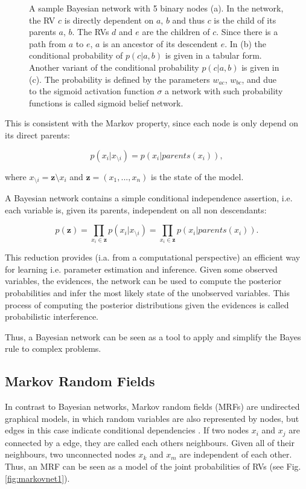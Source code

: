 \begin{figure}
\begin{subfigure}[t]{.33\textwidth}
  		\caption{}
  		\label{fig:sub3}
	\end{subfigure}
	\caption[A sample Bayesian network with 5 binary nodes.]{A sample Bayesian network with 5 binary nodes (a). In the network, the RV $c$ is directly dependent on $a$, $b$ and thus $c$ is the child of its parents $a$, $b$. The RVs $d$ and $e$ are the children of $c$. Since there is a path from $a$ to $e$, $a$ is an ancestor of its descendent $e$. In (b) the conditional probability of $p(c |a , b)$ is given in a tabular form. Another variant of the conditional probability $p(c |a , b)$ is given in (c). The probability is defined by the parameters $w_{ac}$, $w_{bc}$, and due to the sigmoid activation function $\sigma$ a network with such probability functions is called sigmoid belief network.}
	\label{fig:bayesnet}
\end{figure}

This is consistent with the Markov property, since each node is only depend on its direct parents:

\[
p(x_i | x_{\setminus i}) = p(x_i | parents(x_i) ),
\]

where $x_{\setminus i} = \textbf{z} \setminus x_i$ and $\textbf{z} = (x_1, ... , x_n)$ is the state of the model.


A Bayesian network contains a simple conditional independence assertion, i.e. each variable is, given its parents, independent on all non descendants:

\[
p(\textbf{z}) = \prod_{x_i \in \textbf{z}} p(x_i | x_{\setminus i}) = \prod_{x_i \in \textbf{z}} p(x_i | parents(x_i) ) .
\]

This reduction provides (i.a. from a computational perspective) an efficient way for learning i.e. parameter estimation and inference.
Given some observed variables, the evidences, the network can be used to compute the posterior probabilities and infer the most likely state of the unobserved variables.
This process of computing the posterior distributions given the evidences is called probabilistic interference.

Thus, a Bayesian network can be seen as a tool to apply and simplify the Bayes rule to complex problems.   

\subsection{Markov Random Fields} \label{c:markovnet}

In contrast to Bayesian networks, Markov random fields (MRFs) are undirected graphical models, in which random variables are also represented by nodes, but edges in this case indicate conditional dependencies \cite{Goodfellow-et-al-2016-Book}\cite{murphy2012machine}.
If two nodes $x_i$ and $x_j$ are connected by a edge, they are called each others neighbours.
Given all of their neighbours, two unconnected nodes $x_k$ and $x_m$ are independent of each other.
Thus, an MRF can be seen as a model of the joint probabilities of RVs (see Fig. \ref{fig:markovnet1}).

